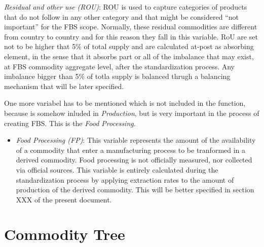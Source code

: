 \documentclass[]{article}
\providecommand{\tightlist}{%
  \setlength{\itemsep}{0pt}\setlength{\parskip}{0pt}}
\begin{document}
\begin{itemize}
  \emph{Residual and other use (ROU)}: ROU is used to capture categories
  of products that do not follow in any other category and that might be
  considered ``not important'' for the FBS scope. Normally, these
  residual commodities are different from country to country and for
  this reason they fall in this variable. RoU are set not to be higher
  that 5\% of total supply and are calculated at-post as absorbing
  element, in the sense that it absorbs part or all of the imbalance
  that may exist, at FBS commodity aggregate level, after the
  standardization process. Any imbalance bigger than 5\% of totla supply
  is balanced thrugh a balancing mechanism that will be later specified.
\end{itemize}

One more variabel has to be mentioned which is not included in the
function, because is somehow inluded in \emph{Production}, but is very
important in the process of creating FBS. This is the \emph{Food
Processing}.

\begin{itemize}
\tightlist
\item
  \emph{Food Processing (FP)}: This variable represents the amount of
  the availability of a commodity that enter a manufacturing process to
  be tranformed in a derived commodity. Food processing is not
  officially measured, nor collected via official sources. This variable
  is entirely calculated during the standardization process by applying
  extraction rates to the amount of production of the derived commodity.
  This will be better specified in section XXX of the present document.
\end{itemize}

\section*{Commodity Tree}\label{commodity-tree}
\end{document}
